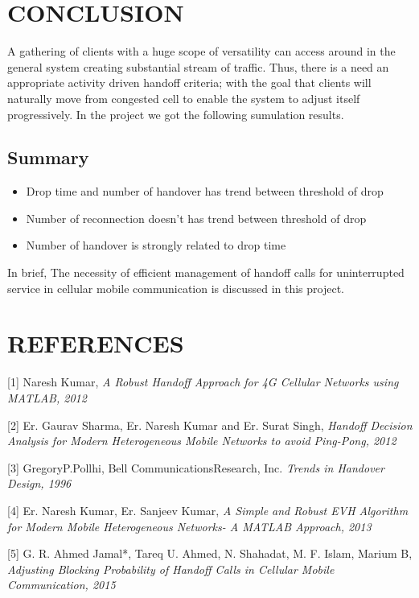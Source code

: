 \documentclass[a4paper]{IEEEtran}
\begin{document}
\section{\textbf{CONCLUSION}}
A gathering of clients with a huge scope of versatility can access around in the general system creating substantial stream of traffic. Thus, there is a need an appropriate activity driven handoff criteria; with the goal that clients will naturally move from congested cell to enable the system to adjust itself progressively. In the project we got the following sumulation results.
\subsection{Summary}
\begin{itemize}
\item{Drop time and number of handover has trend between threshold of drop}
\item{Number of reconnection doesn’t has trend between threshold of drop}
\item{Number of handover is strongly related to drop time}
\end{itemize}
In brief, The necessity of efficient management of handoff calls for uninterrupted service in cellular mobile communication is discussed in this project.


\section{\textbf{REFERENCES}}

[1] Naresh Kumar, \textit{A Robust Handoff Approach for 4G Cellular Networks using MATLAB, 2012}

[2] Er. Gaurav Sharma, Er. Naresh Kumar and Er. Surat Singh,
\textit{
Handoff Decision Analysis for Modern Heterogeneous Mobile Networks to avoid Ping-Pong, 2012}

[3] GregoryP.Pollhi, Bell CommunicationsResearch, Inc. \textit{Trends in Handover Design, 1996}

[4] Er. Naresh Kumar, Er. Sanjeev Kumar, \textit{A Simple and Robust EVH Algorithm for Modern Mobile Heterogeneous Networks- A MATLAB Approach, 2013}

[5] G. R. Ahmed Jamal*, Tareq U. Ahmed, N. Shahadat, M. F. Islam, Marium B, \textit{Adjusting Blocking Probability of Handoff Calls in Cellular Mobile Communication, 2015}
\end{document}
